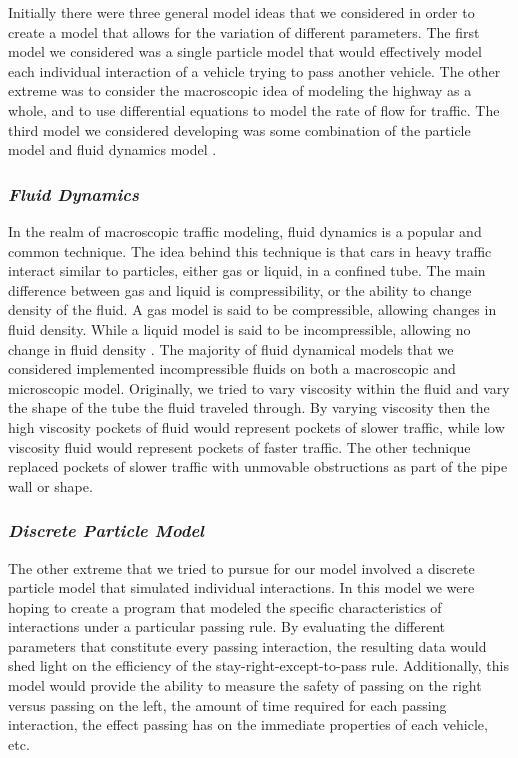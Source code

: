 \documentclass{amsart}
\begin{document}
	Initially there were three general model ideas that we considered in order to create a model that allows for the variation of different parameters. The first model we considered was a single particle model that would effectively model each individual interaction of a vehicle trying to pass another vehicle. The other extreme was to consider the macroscopic idea of modeling the highway as a whole, and to use differential equations to model the rate of flow for traffic. The third model we considered developing was some combination of the particle model and fluid dynamics model \cite{burghout2005}.
		
		\subsubsection{\it Fluid Dynamics}
		In the realm of macroscopic traffic modeling, fluid dynamics is a popular and common technique. The idea behind this technique is that cars in heavy traffic interact similar to particles, either gas or liquid, in a confined tube. The main difference between gas and liquid is compressibility, or the ability to change density of the fluid. A gas model is said to be compressible, allowing changes in  fluid density. While a liquid model is said to be incompressible, allowing no change in fluid density \cite{stone2007introduction}. The majority of fluid dynamical models that we considered implemented incompressible fluids on both a macroscopic and microscopic model. Originally, we tried to vary viscosity within the fluid and vary the shape of the tube the fluid traveled through. By varying viscosity then the high viscosity pockets of fluid would represent pockets of slower traffic, while low viscosity fluid would represent pockets of faster traffic. The other technique replaced pockets of slower traffic with unmovable obstructions as part of the pipe wall or shape. 
		
		\subsubsection{\it Discrete Particle Model}
		
	The other extreme that we tried to pursue for our model involved a discrete particle model that simulated individual interactions. In this model we were hoping to create a program that modeled the specific characteristics of interactions under a particular passing rule. By evaluating the different parameters that constitute every passing interaction, the resulting data would shed light on the efficiency of the stay-right-except-to-pass rule. Additionally, this model would provide the ability to measure the safety of passing on the right versus passing on the left, the amount of time required for each passing interaction, the effect passing has on the immediate properties of each vehicle, etc. 
	
\end{document}
